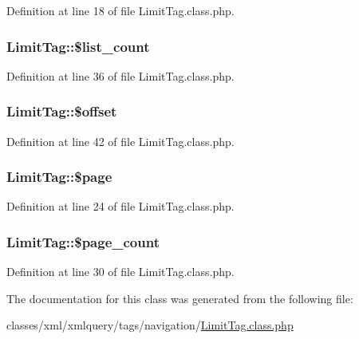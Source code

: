 Definition at line 18 of file Limit\-Tag.\-class.\-php.

\hypertarget{classLimitTag_aec51c8433d2e7a1e009b7c331702cef0}{
\subsubsection[{\$list\-\_\-count}]{\setlength{\rightskip}{0pt plus 5cm}Limit\-Tag\-::\$list\-\_\-count}}\label{classLimitTag_aec51c8433d2e7a1e009b7c331702cef0}


Definition at line 36 of file Limit\-Tag.\-class.\-php.

\hypertarget{classLimitTag_adbc76de9e00e8d0a724e49dec7e208ae}{
\subsubsection[{\$offset}]{\setlength{\rightskip}{0pt plus 5cm}Limit\-Tag\-::\$offset}}\label{classLimitTag_adbc76de9e00e8d0a724e49dec7e208ae}


Definition at line 42 of file Limit\-Tag.\-class.\-php.

\hypertarget{classLimitTag_aae0faff40b6bcd38d72350bd851ecd4b}{
\subsubsection[{\$page}]{\setlength{\rightskip}{0pt plus 5cm}Limit\-Tag\-::\$page}}\label{classLimitTag_aae0faff40b6bcd38d72350bd851ecd4b}


Definition at line 24 of file Limit\-Tag.\-class.\-php.

\hypertarget{classLimitTag_a3d25270d024a280ac3e1cc7ada2c8fe0}{
\subsubsection[{\$page\-\_\-count}]{\setlength{\rightskip}{0pt plus 5cm}Limit\-Tag\-::\$page\-\_\-count}}\label{classLimitTag_a3d25270d024a280ac3e1cc7ada2c8fe0}


Definition at line 30 of file Limit\-Tag.\-class.\-php.



The documentation for this class was generated from the following file\-:\begin{DoxyCompactItemize}
\item 
classes/xml/xmlquery/tags/navigation/\hyperlink{LimitTag_8class_8php}{Limit\-Tag.\-class.\-php}\end{DoxyCompactItemize}

